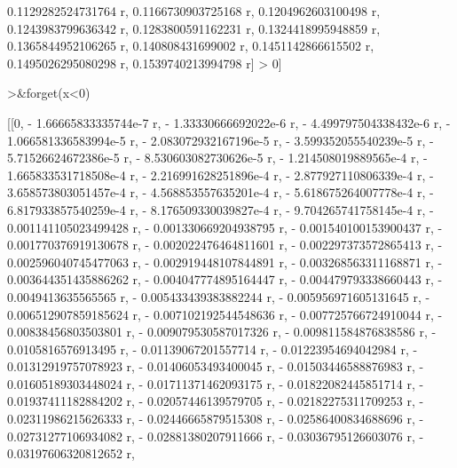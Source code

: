 \documentclass[a4paper,10pt]{article}
\begin{document}
\begin{eulernotebook}
\begin{eulercomment}
\begin{eulercomment}
\begin{eulercomment}
\begin{eulercomment}
\begin{eulercomment}
\begin{eulercomment}
\begin{eulercomment}
\begin{eulercomment}
\begin{eulercomment}
\begin{eulercomment}
\begin{eulercomment}
\begin{eulercomment}
\begin{eulercomment}
\begin{eulercomment}
\begin{eulercomment}
\begin{eulercomment}
\begin{eulercomment}
\begin{eulercomment}
\begin{eulercomment}
\begin{eulercomment}
\begin{eulercomment}
\begin{eulercomment}
\begin{eulercomment}
\begin{eulercomment}
\begin{eulercomment}
\begin{eulercomment}
\begin{eulercomment}
\begin{eulercomment}
\begin{euleroutput}
  0.1129282524731764 r, 0.1166730903725168 r, 0.1204962603100498 r, 
  0.1243983799636342 r, 0.1283800591162231 r, 0.1324418995948859 r, 
  0.1365844952106265 r, 0.140808431699002 r, 0.1451142866615502 r, 
  0.1495026295080298 r, 0.1539740213994798 r] > 0]
  
\end{euleroutput}
\begin{eulerprompt}
>&forget(x<0)
\end{eulerprompt}
\begin{euleroutput}
  
          [[0, - 1.66665833335744e-7 r, - 1.33330666692022e-6 r, 
  - 4.499797504338432e-6 r, - 1.066581336583994e-5 r, 
  - 2.083072932167196e-5 r, - 3.599352055540239e-5 r, 
  - 5.71526624672386e-5 r, - 8.530603082730626e-5 r, 
  - 1.214508019889565e-4 r, - 1.665833531718508e-4 r, 
  - 2.216991628251896e-4 r, - 2.877927110806339e-4 r, 
  - 3.658573803051457e-4 r, - 4.568853557635201e-4 r, 
  - 5.618675264007778e-4 r, - 6.817933857540259e-4 r, 
  - 8.176509330039827e-4 r, - 9.704265741758145e-4 r, 
  - 0.001141105023499428 r, - 0.001330669204938795 r, 
  - 0.001540100153900437 r, - 0.001770376919130678 r, 
  - 0.002022476464811601 r, - 0.002297373572865413 r, 
  - 0.002596040745477063 r, - 0.002919448107844891 r, 
  - 0.003268563311168871 r, - 0.003644351435886262 r, 
  - 0.004047774895164447 r, - 0.004479793338660443 r, 
  - 0.0049413635565565 r, - 0.005433439383882244 r, 
  - 0.005956971605131645 r, - 0.006512907859185624 r, 
  - 0.007102192544548636 r, - 0.007725766724910044 r, 
  - 0.00838456803503801 r, - 0.009079530587017326 r, 
  - 0.009811584876838586 r, - 0.0105816576913495 r, 
  - 0.01139067201557714 r, - 0.01223954694042984 r, 
  - 0.01312919757078923 r, - 0.01406053493400045 r, 
  - 0.01503446588876983 r, - 0.01605189303448024 r, 
  - 0.01711371462093175 r, - 0.01822082445851714 r, 
  - 0.01937411182884202 r, - 0.02057446139579705 r, 
  - 0.02182275311709253 r, - 0.02311986215626333 r, 
  - 0.02446665879515308 r, - 0.02586400834688696 r, 
  - 0.02731277106934082 r, - 0.02881380207911666 r, 
  - 0.03036795126603076 r, - 0.03197606320812652 r, 

\end{euleroutput}
\end{eulercomment}
\end{eulercomment}
\end{eulercomment}
\end{eulercomment}
\end{eulercomment}
\end{eulercomment}
\end{eulercomment}
\end{eulercomment}
\end{eulercomment}
\end{eulercomment}
\end{eulercomment}
\end{eulercomment}
\end{eulercomment}
\end{eulercomment}
\end{eulercomment}
\end{eulercomment}
\end{eulercomment}
\end{eulercomment}
\end{eulercomment}
\end{eulercomment}
\end{eulercomment}
\end{eulercomment}
\end{eulercomment}
\end{eulercomment}
\end{eulercomment}
\end{eulercomment}
\end{eulercomment}
\end{eulercomment}
\end{eulernotebook}
\end{document}
